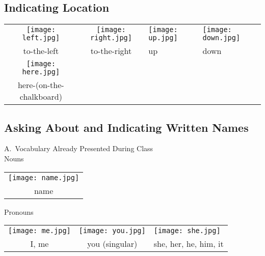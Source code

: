 \documentclass{tufte-book}
\begin{document}
\subsection{Indicating Location}

\begin{table*}[h!]

\begin{tabular}{c c l l}
\texttt{[image: left.jpg]} & \texttt{[image: right.jpg]} &\texttt{[image: up.jpg]} & \texttt{[image: down.jpg]}\\
\footnotesize to-the-left & \footnotesize to-the-right & \footnotesize up & \footnotesize down\\
\texttt{[image: here.jpg]}\\
\footnotesize here-(on-the-chalkboard)\\

\end{tabular}
\end{table*}
\newpage

\subsection{Asking About and Indicating Written Names}

\noindent A.~Vocabulary Already Presented During Class\\ 

\vspace{0.25cm}\noindent Nouns

\begin{table}[h!]
\begin{tabular}{c}

\texttt{[image: name.jpg]}\\
\footnotesize name\index{name!written name}\\
\end{tabular}
\end{table}

\noindent Pronouns

\begin{table*}[h!]

\begin{tabular}{c c l }
\texttt{[image: me.jpg]} & \texttt{[image: you.jpg]} &\texttt{[image: she.jpg]} \\
\footnotesize I, me & \footnotesize you (singular) & \footnotesize she, her, he, him, it \\

\end{tabular}
\end{table*}
\end{document}
